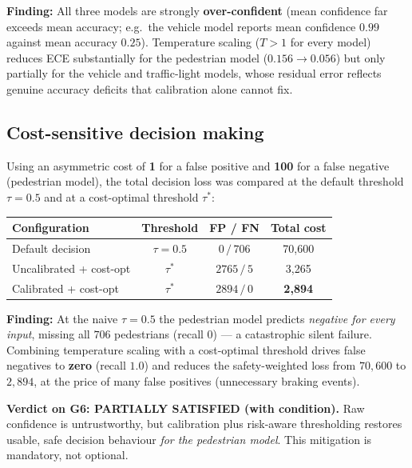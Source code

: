 \documentclass[11pt,a4paper]{article}
\newcommand{\claim}[2]{\vspace{2pt}\noindent\textbf{\color{claimblue}#1:} #2\par\vspace{2pt}}
\begin{document}
\claim{Finding}{All three models are strongly \textbf{over-confident} (mean
confidence far exceeds mean accuracy; e.g.\ the vehicle model reports mean
confidence $0.99$ against mean accuracy $0.25$). Temperature scaling
($T>1$ for every model) reduces ECE substantially for the pedestrian model
($0.156 \rightarrow 0.056$) but only partially for the vehicle and traffic-light
models, whose residual error reflects genuine accuracy deficits that calibration
alone cannot fix.}

\subsection{Cost-sensitive decision making}
Using an asymmetric cost of \textbf{1} for a false positive and \textbf{100} for
a false negative (pedestrian model), the total decision loss was compared at the
default threshold $\tau=0.5$ and at a cost-optimal threshold $\tau^{\ast}$:

\begin{center}
\begin{tabular}{lccc}
\toprule
\textbf{Configuration} & \textbf{Threshold} & \textbf{FP / FN} & \textbf{Total cost} \\
\midrule
Default decision     & $\tau=0.5$        & $0 \,/\, 706$ & 70{,}600 \\
Uncalibrated + cost-opt & $\tau^{\ast}$   & $2765 \,/\, 5$ & 3{,}265 \\
\rowcolor{claimblue!12}
Calibrated + cost-opt   & $\tau^{\ast}$   & $2894 \,/\, 0$ & \textbf{2{,}894} \\
\bottomrule
\end{tabular}
\end{center}

\claim{Finding}{At the naive $\tau=0.5$ the pedestrian model predicts
\emph{negative for every input}, missing all $706$ pedestrians (recall $0$) --- a
catastrophic silent failure. Combining temperature scaling with a
cost-optimal threshold drives false negatives to \textbf{zero} (recall $1.0$) and
reduces the safety-weighted loss from $70{,}600$ to $2{,}894$, at the price of
many false positives (unnecessary braking events).}

\begin{tcolorbox}[colback=orange!8,colframe=orange!70!black]
\textbf{Verdict on G6: PARTIALLY SATISFIED (with condition).} Raw confidence is
untrustworthy, but calibration plus risk-aware thresholding restores usable, safe
decision behaviour \emph{for the pedestrian model}. This mitigation is mandatory,
not optional.
\end{tcolorbox}
\end{document}
